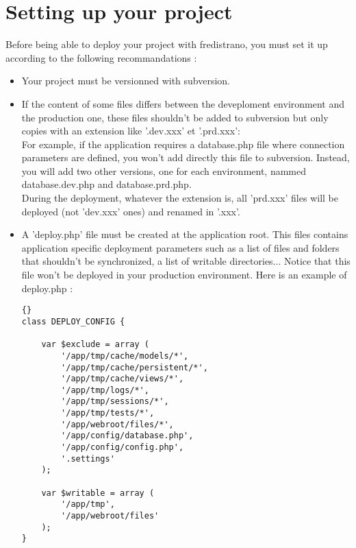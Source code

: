 \documentclass[12pt,a4paper]{report}
\begin{document}
\section{Setting up your project}\label{precimportantes}
Before being able to deploy your project with fredistrano, you must set it up according to the following recommandations :\\
\begin{itemize}
\item Your project must be versionned with subversion.\\
\item If the content of some files differs between the deveploment environment and the production one, these files shouldn't be added to subversion but only copies with an extension like '.dev.xxx' et '.prd.xxx':\\
For example, if the application requires a database.php file where connection parameters are defined, you won't add directly this file to subversion. Instead, you will add two other versions, one for each environment, nammed database.dev.php and database.prd.php.\\ 
During the deployment, whatever the extension is, all 'prd.xxx' files will be deployed (not 'dev.xxx' ones) and renamed in '.xxx'.
\item A 'deploy.php' file must be created at the application root. This files contains application specific deployment parameters such as a list of files and folders that shouldn't be synchronized, a list of writable directories... Notice that this file won't be deployed in your production environment. Here is an example of deploy.php :\\

\lstset{language=Php}
\lstset{commentstyle=\textit}
\begin{lstlisting}[frame=tb]{}
class DEPLOY_CONFIG {

	var $exclude = array (
		'/app/tmp/cache/models/*',
		'/app/tmp/cache/persistent/*',
		'/app/tmp/cache/views/*',
		'/app/tmp/logs/*',
		'/app/tmp/sessions/*',
		'/app/tmp/tests/*',
		'/app/webroot/files/*',
		'/app/config/database.php',
		'/app/config/config.php',
		'.settings'
	);

	var $writable = array (
		'/app/tmp',
		'/app/webroot/files'
	);
}
\end{lstlisting}

\end{itemize}
\newpage
\end{document}
